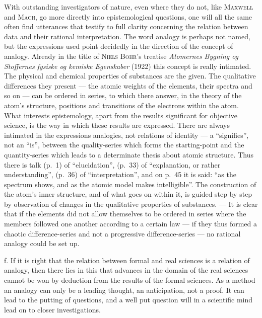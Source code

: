 \documentclass[12pt]{book}
\newcommand{\opage}[1]{\marginnote{\footnotesize\textit{[#1]}}}
\begin{document}
With outstanding investigators of nature, even where they do not, like
\textsc{Maxwell} and \textsc{Mach}, go more directly into epistemological
questions, one will all the same often find utterances that testify to full
clarity concerning the relation between data and their rational interpretation.
The word analogy is perhaps not named, but the expressions used point decidedly
in the direction of the concept of analogy. Already in the title of \textsc{Niels
Bohr}'s treatise \textit{Atomernes Bygning og Stoffernes fysiske og kemiske
Egenskaber} (1922) this concept is really \opage{99}intimated. The physical and chemical
properties of substances are the given. The qualitative differences they present
--- the atomic weights of the elements, their spectra and so on --- can be ordered
in series, to which there answer, in the theory of the atom's structure, positions
and transitions of the electrons within the atom. What interests epistemology,
apart from the results significant for objective science, is the way in which
these results are expressed. There are always intimated in the expressions
analogies, not relations of identity --- a ``signifies'', not an ``is'', between
the quality-series which forms the starting-point and the quantity-series which
leads to a determinate thesis about atomic structure. Thus there is talk (p.\ 1)
of ``elucidation'', (p.\ 33) of ``explanation, or rather understanding'', (p.\ 36)
of ``interpretation'', and on p.\ 45 it is said: ``as the spectrum shows, and as
the atomic model makes intelligible''. The construction of the atom's inner
structure, and of what goes on within it, is guided step by step by observation of
changes in the qualitative properties of substances. --- It is clear that if the
elements did not allow themselves to be ordered in series where the members
followed one another according to a certain law --- if they thus formed a chaotic
difference-series and not a progressive difference-series --- no rational analogy
could be set up.

f. If it is right that the relation between formal and real sciences is a relation
of analogy, then there lies in this that advances in the domain of the real
sciences cannot be won by deduction from the results of the formal sciences. As a
method an analogy can only be a leading thought, an anticipation, not a proof. It
can lead to the putting of questions, and a well put question will in a scientific
mind lead on to closer investigations.
\end{document}
